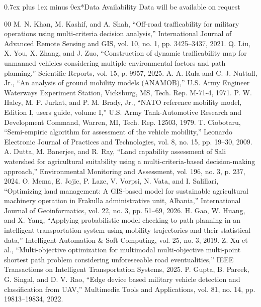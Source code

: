 \documentclass[conference]{IEEEtran}
\makeatletter
\def\section{\needspace{7\baselineskip}\@startsection{section}{1}{\z@}{2.5ex plus 1ex minus 0.5ex}%
{0.7ex plus 1ex minus 0ex}{\normalfont\normalsize\centering\scshape}}
\makeatother
\begin{document}
\section*{Data Availability}
Data will be available on request

\begin{thebibliography}{00}
 M. N. Khan, M. Kashif, and A. Shah, ``Off-road trafficability for military operations using multi-criteria decision analysis,'' International Journal of Advanced Remote Sensing and GIS, vol. 10, no. 1, pp. 3425--3437, 2021.
 Q. Liu, X. You, X. Zhang, and J. Zuo, ``Construction of dynamic trafficability map for unmanned vehicles considering multiple environmental factors and path planning,'' Scientific Reports, vol. 15, p. 9957, 2025.
 A. A. Rula and C. J. Nuttall, Jr., ``An analysis of ground mobility models (ANAMOB),'' U.S. Army Engineer Waterways Experiment Station, Vicksburg, MS, Tech. Rep. M-71-4, 1971.
 P. W. Haley, M. P. Jurkat, and P. M. Brady, Jr., ``NATO reference mobility model, Edition I, users guide, volume I,'' U.S. Army Tank-Automotive Research and Development Command, Warren, MI, Tech. Rep. 12503, 1979.
 T. Ciobotaru, ``Semi-empiric algorithm for assessment of the vehicle mobility,'' Leonardo Electronic Journal of Practices and Technologies, vol. 8, no. 15, pp. 19--30, 2009.
 A. Dutta, M. Banerjee, and R. Ray, ``Land capability assessment of Sali watershed for agricultural suitability using a multi-criteria-based decision-making approach,'' Environmental Monitoring and Assessment, vol. 196, no. 3, p. 237, 2024.
 O. Mema, E. Jojie, P. Laze, V. Vorpsi, N. Vata, and I. Salillari, ``Optimizing land management: A GIS-based model for sustainable agricultural machinery operation in Frakulla administrative unit, Albania,'' International Journal of Geoinformatics, vol. 22, no. 3, pp. 51--69, 2026.
 H. Gao, W. Huang, and X. Yang, ``Applying probabilistic model checking to path planning in an intelligent transportation system using mobility trajectories and their statistical data,'' Intelligent Automation \& Soft Computing, vol. 25, no. 3, 2019.
 Z. Xu et al., ``Multi-objective optimization for multimodal multi-objective multi-point shortest path problem considering unforeseeable road eventualities,'' IEEE Transactions on Intelligent Transportation Systems, 2025.
 P. Gupta, B. Pareek, G. Singal, and D. V. Rao, ``Edge device based military vehicle detection and classification from UAV,'' Multimedia Tools and Applications, vol. 81, no. 14, pp. 19813--19834, 2022.

\end{thebibliography}
\end{document}
